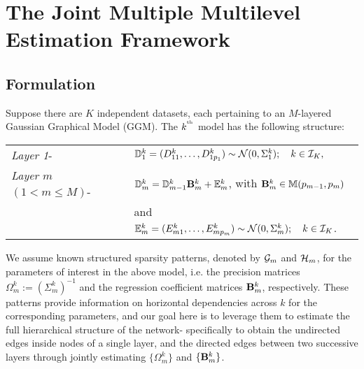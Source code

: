 \section{The Joint Multiple Multilevel Estimation Framework}
\label{sec:sec2}

\subsection{Formulation}
Suppose there are $K$ independent datasets, each pertaining to an $M$-layered Gaussian Graphical Model (GGM). The $k^{\operatorname*{^{\text{th}}}}$ model has the following structure:

\vspace{1em}
\begin{tabular}{ll}
{\it Layer 1}- &
%
${\mathbb{D}}_1^k = (D_{1 1}^k, \ldots, D^k_{1 p_1}) \sim
{\cal{N}} (0, \Sigma_1^k); \quad k \in {\cal{I}}_K,$\\
{\it Layer $m$} $(1< m \leq M)$-  &
%
$ {\mathbb{D}}_m^k = {\mathbb{D}}_{m-1}^k {\mathbf{B}}_m^k + {\mathbb{E}}_m^k$, with ${\mathbf{B}}_m^k \in {\mathbb{M}}(p_{m-1}, p_m) $\\
& and ${\mathbb{E}}_m^k = (E_{m 1}^k, \ldots, E^k_{m p_m}) \sim
{\cal{N}} (0, \Sigma_m^k); \quad k \in {\cal{I}}_K $.\\
\end{tabular}
\vspace{1em}

We assume known structured sparsity patterns, denoted by ${\cal{G}}_m$ and ${\cal{H}}_m$, for the parameters of interest in the above model, i.e. the precision matrices $\Omega_m^k := (\Sigma_m^k)^{-1}$ and the regression coefficient matrices ${\mathbf{B}}_m^k$, respectively. These patterns provide information on horizontal dependencies across $k$ for the corresponding parameters, and our goal here is to leverage them to estimate the full hierarchical structure of the network- specifically to obtain the undirected edges inside nodes of a single layer, and the directed edges between two successive layers through jointly estimating $\{ \Omega_m^k \}$ and $\{ {\mathbf{B}}_m^k \}$.

